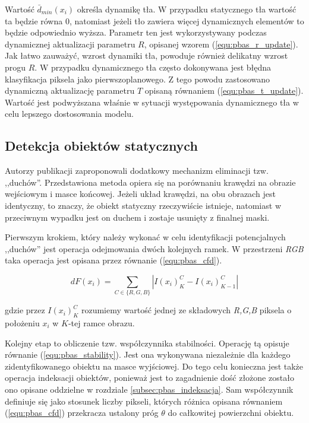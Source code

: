 Wartość $\bar{d}_{min}(x_i)$ określa dynamikę tła. 
W przypadku statycznego tła wartość ta będzie równa 0, natomiast jeżeli tło zawiera więcej dynamicznych elementów to będzie odpowiednio wyższa. Parametr ten jest wykorzystywany podczas dynamicznej aktualizacji parametru $R$, opisanej wzorem (\ref{equ:pbas_r_update}). Jak łatwo zauważyć, wzrost dynamiki tła, powoduje również delikatny wzrost progu $R$. W przypadku dynamicznego tła często dokonywana jest błędna klasyfikacja piksela jako pierwszoplanowego. 
Z tego powodu zastosowano dynamiczną aktualizację parametru $T$ opisaną równaniem (\ref{equ:pbas_t_update}). 
Wartość jest podwyższana właśnie w sytuacji występowania dynamicznego tła w celu lepszego dostosowania modelu.

\subsection{Detekcja obiektów statycznych}
\label{subsec:pbas_duchy}

Autorzy publikacji \cite{kryjak_14_pbas} zaproponowali dodatkowy mechanizm eliminacji tzw. ,,duchów''. 
Przedstawiona metoda opiera się na porównaniu krawędzi na obrazie wejściowym i masce końcowej. 
Jeżeli układ krawędzi, na obu obrazach jest identyczny, to znaczy, że obiekt statyczny rzeczywiście istnieje, natomiast w przeciwnym wypadku jest on duchem i zostaje usunięty z finalnej maski. 



Pierwszym krokiem, który należy wykonać w celu identyfikacji potencjalnych ,,duchów'' jest operacja odejmowania dwóch kolejnych ramek. 
W przestrzeni \textit{RGB} taka operacja jest opisana przez równanie (\ref{equ:pbas_cfd}).

    \begin{equation}
        dF(x_i) = \sum_{C \in \{R,G,B\}} | I(x_i)_{K}^C - I(x_i)_{K-1}^C |
    \label{equ:pbas_cfd}
    \end{equation}
    
\noindent gdzie przez $I(x_i)_{K}^C$ rozumiemy wartość jednej ze składowych \textit{R,G,B} piksela o położeniu $x_i$ w $K$-tej ramce obrazu.

Kolejny etap to obliczenie tzw. współczynnika stabilności. 
Operację tą opisuje równanie (\ref{equ:pbas_stability}). 
Jest ona wykonywana niezależnie dla każdego zidentyfikowanego obiektu na masce wyjściowej. 
Do tego celu konieczna jest także operacja indeksacji obiektów, ponieważ jest to zagadnienie dość złożone zostało ono opisane oddzielne w rozdziale \ref{subsec:pbas_indeksacja}. 
Sam współczynnik definiuje się jako stosunek liczby pikseli, których różnica opisana równaniem (\ref{equ:pbas_cfd}) przekracza ustalony próg $\theta$ do całkowitej powierzchni obiektu.

